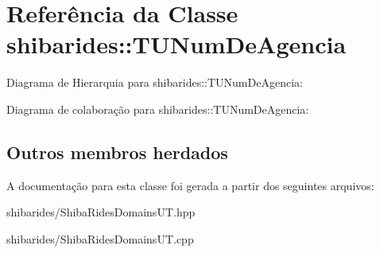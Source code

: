 \hypertarget{classshibarides_1_1TUNumDeAgencia}{}\section{Referência da Classe shibarides\+:\+:T\+U\+Num\+De\+Agencia}
\label{classshibarides_1_1TUNumDeAgencia}


Diagrama de Hierarquia para shibarides\+:\+:T\+U\+Num\+De\+Agencia\+:


Diagrama de colaboração para shibarides\+:\+:T\+U\+Num\+De\+Agencia\+:
\subsection*{Outros membros herdados}


A documentação para esta classe foi gerada a partir dos seguintes arquivos\+:\begin{DoxyCompactItemize}
\item 
shibarides/Shiba\+Rides\+Domains\+U\+T.\+hpp\item 
shibarides/Shiba\+Rides\+Domains\+U\+T.\+cpp\end{DoxyCompactItemize}
